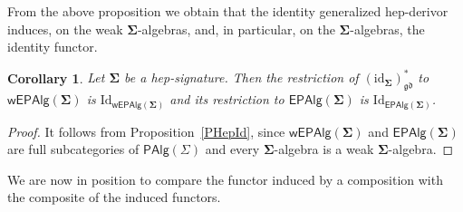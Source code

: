 \documentclass[a4paper, reqno
]{amsart}
\newcommand{\sig}[1]{\mathbf{#1}}             %
\newcommand{\id}{\mathrm{id}}
\newcommand{\Id}{\mathrm{Id}}
\newcommand{\gd}{\mathfrak{gd}}              %
\theoremstyle{plain}
\newtheorem{corollary}[theorem]{Corollary}
\theoremstyle{definition}
\begin{document}
From the above proposition we obtain that the identity generalized hep-derivor induces, on the weak $\sig{\Sigma}$-algebras, and, in particular, on the $\sig{\Sigma}$-algebras, the identity functor.

\begin{corollary}\label{CHepId}
Let $\sig{\Sigma}$ be a hep-signature.
Then the restriction of $(\id_{\sig{\Sigma}})^{\ast}_{\gd}$ to $\mathsf{wEPAlg}(\sig{\Sigma})$ is $\Id_{\mathsf{wEPAlg}(\sig{\Sigma})}$ and its restriction to $\mathsf{EPAlg}(\sig{\Sigma})$ is $\Id_{\mathsf{EPAlg}(\sig{\Sigma})}$.
\end{corollary}
\begin{proof}
It follows from Proposition~\ref{PHepId}, since $\mathsf{wEPAlg}(\sig{\Sigma})$ and $\mathsf{EPAlg}(\sig{\Sigma})$ are full subcategories of $\mathsf{PAlg}(\Sigma)$ and every $\sig{\Sigma}$-algebra is a weak $\sig{\Sigma}$-algebra.
\end{proof}

We are now in position to compare the functor induced by a composition with the composite of the induced functors.
\end{document}
